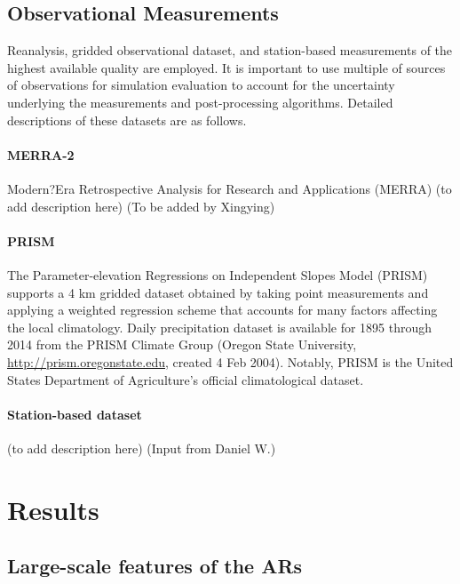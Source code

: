 \documentclass[draft,ms]{agutex}   %
\begin{document}
\begin{article}

\subsection{Observational Measurements}

Reanalysis, gridded observational dataset, and station-based measurements of the highest available quality are employed. It is important to use multiple of sources of observations for simulation evaluation to account for the uncertainty underlying the measurements and post-processing algorithms. Detailed descriptions of these datasets are as follows.

\paragraph{MERRA-2} Modern?Era Retrospective Analysis for Research and Applications (MERRA) \citep{rienecker2011merra} (to add description here) {\color{red}(To be added by Xingying)}

\paragraph{PRISM} The Parameter-elevation Regressions on Independent Slopes Model (PRISM) \citep{daly2008physiographically} supports a 4 km gridded dataset obtained by taking point measurements and applying a weighted regression scheme that accounts for many factors affecting the local climatology. Daily precipitation dataset is available for 1895 through 2014 from the PRISM Climate Group (Oregon State University, \url{http://prism.oregonstate.edu}, created 4 Feb 2004). Notably, PRISM is the United States Department of Agriculture's official climatological dataset.

\paragraph{Station-based dataset} (to add description here) {\color{red}(Input from Daniel W.)}


\section{Results}


\subsection{Large-scale features of the ARs}


\end{article}
\end{document}
